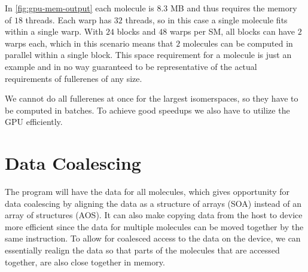 In \autoref{fig:gpu-mem-output} each molecule is $8.3$ MB and thus requires the memory of $18$ threads. Each warp has $32$ threads, so in this case a single molecule fits within a single warp. With $24$ blocks and $48$ warps per SM, all blocks can have $2$ warps each, which in this scenario means that $2$ molecules can be computed in parallel within a single block. This space requirement for a molecule is just an example and in no way guaranteed to be representative of the actual requirements of fullerenes of any size.


%
%






We cannot do all fullerenes at once for the largest isomerspaces, so they have to be computed in batches. To achieve good speedups we also have to utilize the GPU efficiently.

\section{Data Coalescing}


The program will have the data for all molecules, which gives opportunity for data coalescing by aligning the data as a structure of arrays (SOA) instead of an array of structures (AOS). It can also make copying data from the host to device more efficient since the data for multiple molecules can be moved together by the same instruction. To allow for coalesced access to the data on the device, we can essentially realign the data so that parts of the molecules that are accessed together, are also close together in memory.%

